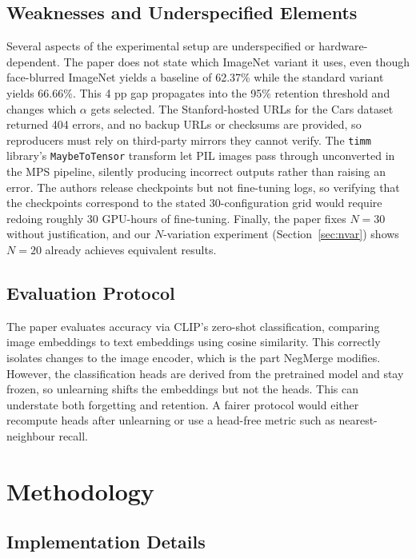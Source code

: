 \documentclass{article}
\begin{document}
\subsection{Weaknesses and Underspecified Elements}

Several aspects of the experimental setup are underspecified or hardware-dependent. The paper does not state which ImageNet variant it uses, even though face-blurred ImageNet yields a baseline of 62.37\% while the standard variant yields 66.66\%. This 4 pp gap propagates into the 95\% retention threshold and changes which $\alpha$ gets selected. The Stanford-hosted URLs for the Cars dataset returned 404 errors, and no backup URLs or checksums are provided, so reproducers must rely on third-party mirrors they cannot verify. The \texttt{timm} library's \texttt{MaybeToTensor} transform let PIL images pass through unconverted in the MPS pipeline, silently producing incorrect outputs rather than raising an error. The authors release checkpoints but not fine-tuning logs, so verifying that the checkpoints correspond to the stated 30-configuration grid would require redoing roughly 30 GPU-hours of fine-tuning. Finally, the paper fixes $N = 30$ without justification, and our $N$-variation experiment (Section~\ref{sec:nvar}) shows $N = 20$ already achieves equivalent results.

\subsection{Evaluation Protocol}

The paper evaluates accuracy via CLIP's zero-shot classification, comparing image embeddings to text embeddings using cosine similarity. This correctly isolates changes to the image encoder, which is the part NegMerge modifies. However, the classification heads are derived from the pretrained model and stay frozen, so unlearning shifts the embeddings but not the heads. This can understate both forgetting and retention. A fairer protocol would either recompute heads after unlearning or use a head-free metric such as nearest-neighbour recall.

\section{Methodology}

\subsection{Implementation Details}
\end{document}

